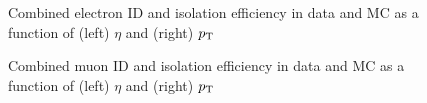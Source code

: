 \begin{figure}[htb]
\caption{Combined electron ID and isolation efficiency in data and MC as a
function of (left) $\eta$ and (right) $p_{\mathrm{T}}$}
\label{fig:electronIdIso}
\end{figure}

\begin{figure}[htb]
\caption{Combined muon ID and isolation efficiency in data and MC as a function
of (left) $\eta$ and (right) $p_{\mathrm{T}}$}
\label{fig:muonIdIso}
\end{figure}

